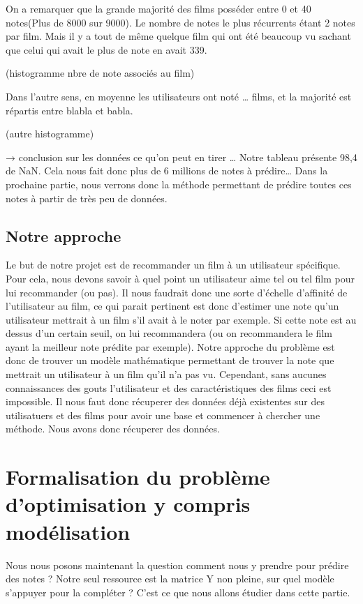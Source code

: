 \documentclass[a4paper,10pt]{article}
\begin{document}
On a remarquer que la grande majorité des films posséder entre 0 et 40 notes(Plus de 8000 sur 9000). 
Le nombre de notes le plus récurrents étant 2 notes par film. Mais il y a tout de même quelque film qui ont été
beaucoup vu sachant que celui qui avait le plus de note en avait 339.

(histogramme nbre de note associés au film)

Dans l’autre sens, en moyenne les utilisateurs ont noté … films, et la majorité est répartis entre blabla et babla.

(autre histogramme)

→ conclusion sur les données ce qu’on peut en tirer …
Notre tableau présente 98,4 \pourcent de NaN. Cela nous fait donc plus de 6 millions de notes à prédire… Dans la prochaine partie,
nous verrons donc la méthode permettant de prédire toutes ces notes à partir de très peu de données.

\subsection{Notre approche}
Le but de notre projet est de recommander un film à un utilisateur spécifique. 
Pour cela, nous devons savoir à quel point un utilisateur aime tel ou tel film pour lui recommander (ou pas). 
Il nous faudrait donc une sorte d'échelle d'affinité de l'utilisateur au film, ce qui parait pertinent est donc d'estimer une note qu'un utilisateur mettrait à un film s'il avait à le noter par exemple. 
Si cette note est au dessus d'un certain seuil, on lui recommandera (ou on recommandera le film ayant la meilleur note prédite par exemple). 
Notre approche du problème est donc de trouver un modèle mathématique permettant de trouver la note que mettrait un utilisateur à un film qu'il n'a pas vu. 
Cependant, sans aucunes connaissances des gouts l'utilisateur et des caractéristiques des films ceci est impossible. Il nous faut donc récuperer des données déjà existentes sur des utilisatuers et des films pour avoir une base et commencer à chercher une méthode.  
Nous avons donc récuperer des données.

\section{Formalisation du problème d'optimisation y compris modélisation}

Nous nous posons maintenant la question comment nous y prendre pour prédire des notes ?
Notre seul ressource est la matrice Y non pleine, sur quel modèle s'appuyer pour la compléter ?
C'est ce que nous allons étudier dans cette partie.
\end{document}
